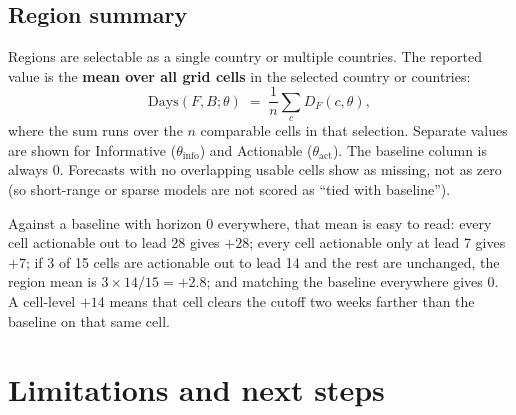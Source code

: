 \documentclass[11pt]{article}
\begin{document}
\subsection*{Region summary}

Regions are selectable as a single country or multiple countries. The reported
value is the \textbf{mean over all grid cells} in the selected country or
countries:
\begin{equation}
\mathrm{Days}(F,B;\theta)
  \;=\;
  \frac{1}{n}\sum_{c} D_F(c,\theta),
\end{equation}
where the sum runs over the \(n\) comparable cells in that selection.
Separate values are shown for Informative (\(\theta_{\mathrm{info}}\)) and
Actionable (\(\theta_{\mathrm{act}}\)).
The baseline column is always \(0\).
Forecasts with no overlapping usable cells show as missing, not as zero
(so short-range or sparse models are not scored as ``tied with baseline'').

Against a baseline with horizon 0 everywhere, that mean is easy to read:
every cell actionable out to lead 28 gives \(+28\); every cell actionable only
at lead 7 gives \(+7\); if 3 of 15 cells are actionable out to lead 14 and the
rest are unchanged, the region mean is \(3\times 14/15=+2.8\); and matching
the baseline everywhere gives \(0\).
A cell-level \(+14\) means that cell clears the cutoff two weeks farther than
the baseline on that same cell.

\section{Limitations and next steps}
\end{document}
